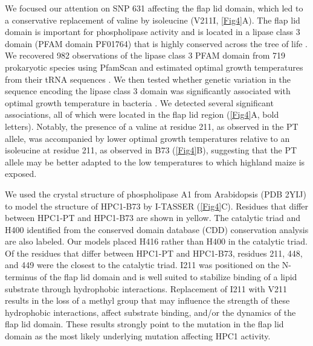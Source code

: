 \documentclass[9pt,twocolumn,twoside,lineno]{biorxiv}
\begin{document}
We focused our attention on SNP 631 affecting the flap lid domain, which led to a conservative replacement of valine by isoleucine (V211I, \cref{Fig4}A).  
The flap lid domain is important for phospholipase activity and is located in a lipase class 3 domain (PFAM domain PF01764) that is highly conserved across the tree of life \cite{Jensen2021-zm}. 
We recovered 982 observations of the lipase class 3 PFAM domain from 719 prokaryotic species using PfamScan \cite{Potter2018-tk, El-Gebali2019-pw} and estimated optimal growth temperatures from their tRNA sequences \cite{Cimen2020-dm}.
We then tested whether genetic variation in the sequence encoding the lipase class 3 domain was significantly associated with optimal growth temperature in bacteria \cite{Jensen2021-iv}. 
We detected several significant associations, all of which were located in the flap lid region (\cref{Fig4}A, bold letters).  
Notably, the presence of a valine at residue 211, as observed in the PT allele, was accompanied by lower optimal growth temperatures relative to an isoleucine at residue 211, as observed in B73 (\cref{Fig4}B), suggesting that the PT allele may be better adapted to the low temperatures to which highland maize is exposed.

We used the crystal structure of phospholipase A1 from Arabidopsis (PDB 2YIJ) to model the structure of HPC1-B73 by I-TASSER (\cref{Fig4}C).
Residues that differ between HPC1-PT and HPC1-B73 are shown in yellow. 
The catalytic triad and H400 identified from the conserved domain database (CDD) conservation analysis are also labeled.
Our models placed H416 rather than H400 in the catalytic triad. 
Of the residues that differ between HPC1-PT and HPC1-B73, residues 211, 448, and 449 were the closest to the catalytic triad. 
I211 was positioned on the N-terminus of the flap lid domain and is well suited to stabilize binding of a lipid substrate through hydrophobic interactions.
Replacement of I211 with V211 results in the loss of a methyl group that may influence the strength of these hydrophobic interactions, affect substrate binding, and/or the dynamics of the flap lid domain.
These results strongly point to the mutation in the flap lid domain as the most likely underlying mutation affecting HPC1 activity.
\end{document}
